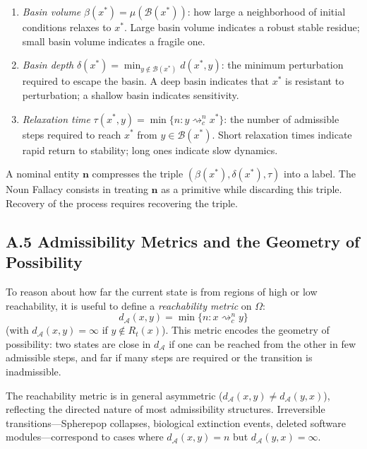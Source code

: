 \documentclass[12pt, a4paper]{article}
\theoremstyle{plain}
\theoremstyle{definition}
\theoremstyle{remark}
\begin{document}
\begin{enumerate}[leftmargin=*, label=(\roman*)]
\item \emph{Basin volume} $\beta(x^*) = \mu(\mathcal{B}(x^*))$: how large a
neighborhood of initial conditions relaxes to $x^*$. Large basin volume
indicates a robust stable residue; small basin volume indicates a fragile one.

\item \emph{Basin depth} $\delta(x^*) = \min_{y \notin \mathcal{B}(x^*)}
d(x^*, y)$: the minimum perturbation required to escape the basin.
A deep basin indicates that $x^*$ is resistant to perturbation; a shallow
basin indicates sensitivity.

\item \emph{Relaxation time} $\tau(x^*, y) = \min\{n : y \rightsquigarrow^n_c x^*\}$:
the number of admissible steps required to reach $x^*$ from $y \in \mathcal{B}(x^*)$.
Short relaxation times indicate rapid return to stability; long ones indicate
slow dynamics.
\end{enumerate}

A nominal entity $\mathbf{n}$ compresses the triple $(\beta(x^*), \delta(x^*),
\tau)$ into a label. The Noun Fallacy consists in treating $\mathbf{n}$ as a
primitive while discarding this triple. Recovery of the process requires
recovering the triple.

\subsection*{A.5 Admissibility Metrics and the Geometry of Possibility}

To reason about how far the current state is from regions of high or low
reachability, it is useful to define a \emph{reachability metric} on $\Omega$:
$$d_{\mathcal{A}}(x, y) = \min\{n : x \rightsquigarrow^n_c y\}$$
(with $d_{\mathcal{A}}(x,y) = \infty$ if $y \notin R_t(x)$). This metric
encodes the geometry of possibility: two states are close in $d_{\mathcal{A}}$
if one can be reached from the other in few admissible steps, and far if many
steps are required or the transition is inadmissible.

The reachability metric is in general asymmetric ($d_{\mathcal{A}}(x,y)
\neq d_{\mathcal{A}}(y,x)$), reflecting the directed nature of most
admissibility structures. Irreversible transitions---Spherepop collapses,
biological extinction events, deleted software modules---correspond to
cases where $d_{\mathcal{A}}(x,y) = n$ but $d_{\mathcal{A}}(y,x) = \infty$.
\end{document}
